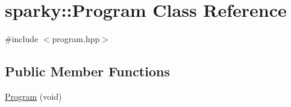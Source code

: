 \hypertarget{classsparky_1_1_program}{}\section{sparky\+:\+:Program Class Reference}
\label{classsparky_1_1_program}


{\ttfamily \#include $<$program.\+hpp$>$}

\subsection*{Public Member Functions}
\begin{DoxyCompactItemize}
\item 
\hyperlink{classsparky_1_1_program_a17217a0c5b6404f974aff8b52d33be3c}{Program} (void)\hypertarget{classsparky_1_1_program_a17217a0c5b6404f974aff8b52d33be3c}{}\label{classsparky_1_1_program_a17217a0c5b6404f974aff8b52d33be3c}


\end{DoxyCompactItemize}
